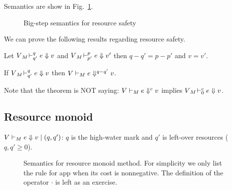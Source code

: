 \documentclass[ manuscript, review,screen, nonacm]{acmart}
\begin{document}
Semantics are show in Fig.~\ref{fig-semReSafety}.

\begin{figure}[htb]
\caption{Big-step semantics for resource safety}
\label{fig-semReSafety}
\end{figure}

We can prove the following results regarding resource safety.
\begin{lemma}
Let $V {}_{M}\!\vdash^{q}_{q'} e \Downarrow v$ and $V {}_{M}\!\vdash^{p}_{p'} e \Downarrow v'$  
then $q-q'=p-p'$ and $v=v'$.
\end{lemma} 
\begin{theorem}
If $V {}_{M}\!\vdash^{q}_{q'} e \Downarrow v$ then $V \vdash_{M} e \Downarrow^{q-q'}v$.
\end{theorem} 
Note that the theorem is NOT saying: $V \vdash_{M} e \Downarrow^{c}v$ implies $V {}_{M}\!\vdash^{c}_{0} e \Downarrow v$. 

\subsection{ Resource monoid}
$V \vdash_{M} e \Downarrow v \mid \left(q,q'\right)$: $q$ is the high-water mark and $q'$ is left-over resources ($q, q' \geq 0$).


\begin{figure}[htb]
\centering
{}
 \caption{Semantics for resource monoid method. For simplicity we only list the rule for app when its cost is nonnegative. The definition of the operator $\cdot$ is left as an exercise.}
 \label{fig:sem-resource-monoid}
\end{figure}
\end{document}
